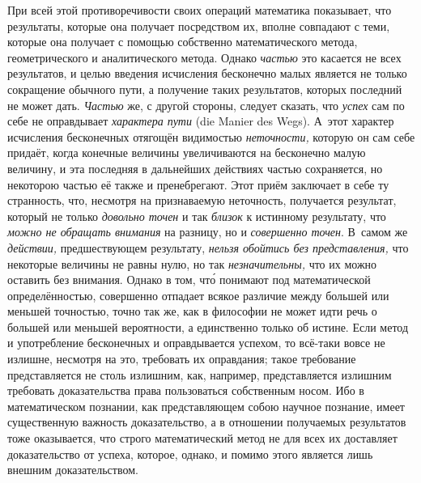 При всей этой противоречивости своих операций математика показывает, что
результаты, которые она получает посредством их, вполне совпадают с теми,
которые она получает с помощью собственно математического метода,
геометрического и аналитического метода. Однако {\em частью} это
касается не всех результатов, и целью введения исчисления бесконечно малых
является не только сокращение обычного пути, а получение таких результатов,
которых последний не может дать. {\em Частью} же, с другой стороны, следует
сказать, что {\em успех} сам по себе не оправдывает {\em характера пути} (die
Manier des Wegs). А~этот характер исчисления бесконечных отягощён
видимостью {\em неточности,} которую он сам себе придаёт, когда конечные
величины увеличиваются на бесконечно малую величину, и эта последняя в
дальнейших действиях частью сохраняется, но некоторою частью её также и
пренебрегают. Этот приём заключает в себе ту странность, что, несмотря на
признаваемую неточность, получается результат, который не только
{\em довольно точен} и так {\em близок} к истинному результату, что
{\em можно не обращать внимания} на разницу, но и {\em совершенно точен}.
В~самом же {\em действии,} предшествующем результату,
{\em нельзя обойтись без представления,} что некоторые величины не равны нулю,
но так {\em незначительны,} что их можно оставить без внимания. Однако в том,
чт\'{о} понимают под математической определённостью, совершенно отпадает всякое
различие между большей или меньшей точностью, точно так же, как в философии не
может идти речь о большей или меньшей вероятности, а единственно только
об истине. Если метод и употребление бесконечных и оправдывается успехом, то
всё-таки вовсе не излишне, несмотря на это, требовать их оправдания; такое
требование представляется не столь излишним, как, например, представляется
излишним требовать доказательства права пользоваться собственным
носом. Ибо в математическом
познании, как представляющем собою научное познание, имеет существенную
важность доказательство, а в отношении получаемых результатов тоже оказывается,
что строго математический метод не для всех их доставляет доказательство от
успеха, которое, однако, и помимо этого является лишь внешним доказательством.


